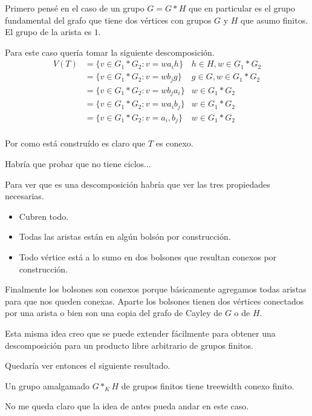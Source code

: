 \documentclass[12pt]{article}
\begin{document}
Primero pensé en el caso de un grupo $G = G \ast H$ que en particular es el grupo fundamental del grafo que tiene dos vértices con grupos $G$ y $H$ que asumo finitos. El grupo de la arista es $1$.

Para este caso quería tomar la siguiente descomposición.
\begin{align*}
V(T) &= \{ v \in G_1 \ast G_2 : v = wa_ih  \} & h \in H, w \in G_1 \ast G_2 \\
 & = \{ v \in G_1 \ast G_2 : v = wb_jg  \} &  g \in G, w \in G_1 \ast G_2 \\
 & = \{ v \in G_1 \ast G_2 : v = wb_ja_i  \} & w \in G_1 \ast G_2 \\
 & = \{ v \in G_1 \ast G_2 : v = wa_ib_j  \} & w \in G_1 \ast G_2 \\
 & = \{ v \in G_1 \ast G_2 : v = a_i, b_j  \} & w \in G_1 \ast G_2 \\
\end{align*}
	
Por como está construído es claro que $T$ es conexo.

Habría que probar que no tiene ciclos... 

Para ver que es una descomposición habría que ver las tres propiedades necesarias.

\begin{itemize}
	\item Cubren todo.
	\item Todas las aristas están en algún bolsón por construcción.
	\item Todo vértice está a lo sumo en dos bolsones que resultan conexos por construcción.
\end{itemize}	
	
Finalmente los bolsones son conexos porque básicamente agregamos todas aristas para que nos queden conexas. 
Aparte los bolsones tienen dos vértices conectados por una arista o bien son una copia del grafo de Cayley de $G$ o de $H$.
	
	
Esta misma idea creo que se puede extender fácilmente para obtener una descomposición para un producto libre arbitrario de grupos finitos.	
	
	
Quedaría ver entonces el siguiente resultado.

\begin{afirmacion}
	Un grupo amalgamado $G \ast_{K} H$	de grupos finitos tiene treewidth conexo finito.
\end{afirmacion}	
	
No me queda claro que la idea de antes pueda andar en este caso. 
\end{document}
